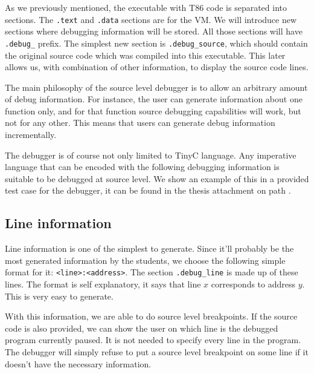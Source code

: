 As we previously mentioned, the executable with T86 code is separated into sections.
The \texttt{.text} and \texttt{.data} sections are for the VM. We will introduce new
sections where debugging information will be stored. All those sections will have
\verb|.debug_| prefix. The simplest new section is \verb|.debug_source|, which
should contain the original source code which was compiled into this executable.
This later allows us, with combination of other information, to display the source
code lines.

The main philosophy of the source level debugger is to allow an arbitrary
amount of debug information. For instance, the user can generate information
about one function only, and for that function source debugging capabilities
will work, but not for any other. This means that users can generate debug
information incrementally.

The debugger is of course not only limited to TinyC language. Any imperative
language that can be encoded with the following debugging information is
suitable to be debugged at source level. We show an example of this in a
provided test case for the debugger, it can be found in the thesis attachment
on path .

\subsection{Line information}
Line information is one of the simplest to generate. Since it'll probably be
the most generated information by the students, we choose the following simple
format for it: \texttt{<line>:<address>}. The section \texttt{.debug\_line} is
made up of these lines. The format is self explanatory, it says that line $x$
corresponds to address $y$. This is very easy to generate.

With this information, we are able to do source level breakpoints. If the
source code is also provided, we can show the user on which line is the
debugged program currently paused. It is not needed to specify every line in
the program. The debugger will simply refuse to put a source level breakpoint
on some line if it doesn't have the necessary information.

